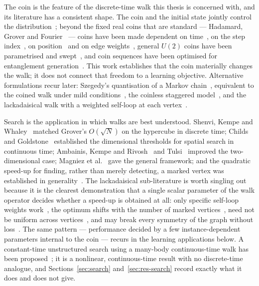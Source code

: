 The coin is the feature of the discrete-time walk this thesis is concerned
with, and its literature has a consistent shape. The coin and the initial
state jointly control the distribution~\cite{Tregenna_2003}; beyond the fixed
real coins that are standard --- Hadamard, Grover and
Fourier~\cite{Komatsu_2019, Saito_2018} --- coins have been made dependent on
time~\cite{C_2006}, on the step index~\cite{Panahiyan_2018}, on
position~\cite{Ahmad_2020} and on edge weights~\cite{Wong_2017}, general
$U(2)$ coins have been parametrised and swept~\cite{Li_2012, Souza_2013,
Naves_2023}, and coin sequences have been optimised for entanglement
generation~\cite{Gratsea_2020}. This work establishes that the coin materially
changes the walk; it does not connect that freedom to a learning objective.
Alternative formulations recur later: Szegedy's quantisation of a Markov
chain~\cite{Szegedy}, equivalent to the coined walk under mild
conditions~\cite{G_2017}, the coinless staggered model~\cite{Portugal_2016},
and the lackadaisical walk with a weighted self-loop at each
vertex~\cite{G_2018}.

Search is the application in which walks are best understood. Shenvi, Kempe
and Whaley~\cite{Shenvi_2002} matched Grover's $O(\sqrt{N})$ on the hypercube
in discrete time; Childs and Goldstone~\cite{Childs_2003, Childs_2004}
established the dimensional thresholds for spatial search in continuous time;
Ambainis, Kempe and Rivosh~\cite{Ambainis_2004} and Tulsi~\cite{Tulsi_2008}
improved the two-dimensional case; Magniez et al.~\cite{Magniez_2007} gave the
general framework; and the quadratic speed-up for finding, rather than merely
detecting, a marked vertex was established in generality~\cite{Ambainis_2019,
Apers_2021}. The lackadaisical sub-literature is worth singling out because
it is the clearest demonstration that a single scalar parameter of the walk
operator decides whether a speed-up is obtained at all: only specific
self-loop weights work~\cite{Giri_2020}, the optimum shifts with the number
of marked vertices~\cite{Nahimovs_2018}, need not be uniform across
vertices~\cite{Rhodes_2019}, and may break every symmetry of the graph
without loss~\cite{Rapoza_2021}. The same pattern --- performance decided by
a few instance-dependent parameters internal to the coin --- recurs in the
learning applications below. A constant-time unstructured search using a
many-body continuous-time walk has been proposed~\cite{DalFavero_2024}; it is
a nonlinear, continuous-time result with no discrete-time analogue, and
Sections~\ref{sec:search} and~\ref{sec:res-search} record exactly what it
does and does not give.

